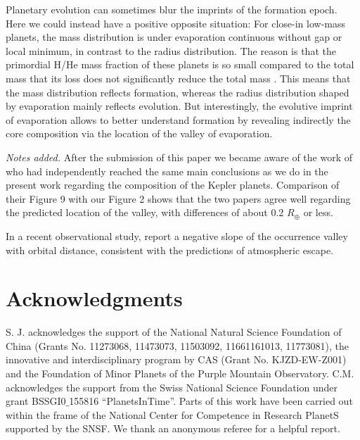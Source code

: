 \documentclass[]{emulateapj}
\def\rearth{R_{\oplus}}
\begin{document}
Planetary evolution can sometimes blur the imprints of the formation epoch. Here we could instead have a positive opposite situation: For close-in low-mass planets, the mass distribution is under evaporation continuous without gap or local minimum, in contrast to the radius distribution. The reason is that the primordial H/He mass fraction of these planets is so small compared to the total mass that its loss does not  significantly reduce the total mass \citep{Jin2014}. This means that the mass distribution reflects formation, whereas the radius distribution shaped by evaporation mainly reflects evolution. But interestingly, the evolutive imprint of evaporation allows to better understand formation by revealing indirectly the core composition via the location of the valley of evaporation.

{\textit{Notes added.} After the submission of this paper we became aware of the work of \citet{Owen2017} who had independently reached the same main conclusions as we do in the present work regarding the composition of the Kepler planets. Comparison of their Figure 9 with our Figure 2 shows that the two papers agree well regarding the predicted location of the valley, with differences of about 0.2  $\rearth$ or less.}

{In a recent observational study, \citet{vaneylen2017} report a negative  slope of the occurrence valley with orbital distance, consistent with the predictions of atmospheric escape. }

\section*{Acknowledgments}
S. J. acknowledges the support of the National Natural Science Foundation of China (Grants No. 11273068, 11473073, 11503092, 11661161013, 11773081), the innovative and interdisciplinary program by CAS (Grant No. KJZD-EW-Z001) and the Foundation of Minor Planets of the Purple Mountain Observatory. C.M. acknowledges the support from the Swiss National Science Foundation under grant BSSGI0$\_$155816 ``PlanetsInTime''. Parts of this work have been carried out within the frame of the National Center for Competence in Research PlanetS supported by the SNSF. {We thank an anonymous referee for a helpful report.}

%
\end{document}
